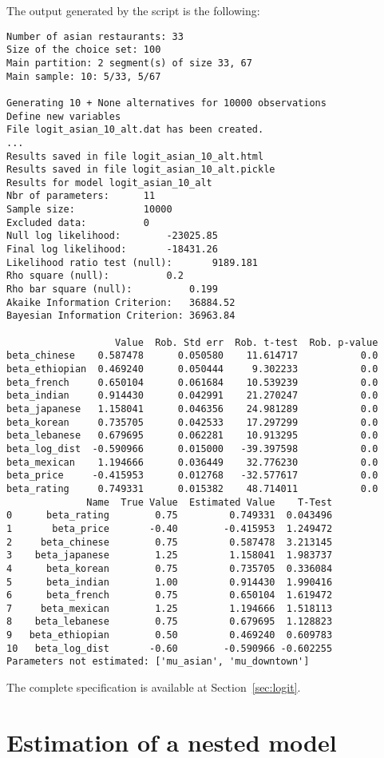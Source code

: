 \documentclass[12pt,a4paper]{article}
\begin{document}
The output generated by the script is the following:
\begin{lstlisting}
Number of asian restaurants: 33
Size of the choice set: 100
Main partition: 2 segment(s) of size 33, 67
Main sample: 10: 5/33, 5/67

Generating 10 + None alternatives for 10000 observations
Define new variables
File logit_asian_10_alt.dat has been created.
...
Results saved in file logit_asian_10_alt.html
Results saved in file logit_asian_10_alt.pickle
Results for model logit_asian_10_alt
Nbr of parameters:		11
Sample size:			10000
Excluded data:			0
Null log likelihood:		-23025.85
Final log likelihood:		-18431.26
Likelihood ratio test (null):		9189.181
Rho square (null):			0.2
Rho bar square (null):			0.199
Akaike Information Criterion:	36884.52
Bayesian Information Criterion:	36963.84

                   Value  Rob. Std err  Rob. t-test  Rob. p-value
beta_chinese    0.587478      0.050580    11.614717           0.0
beta_ethiopian  0.469240      0.050444     9.302233           0.0
beta_french     0.650104      0.061684    10.539239           0.0
beta_indian     0.914430      0.042991    21.270247           0.0
beta_japanese   1.158041      0.046356    24.981289           0.0
beta_korean     0.735705      0.042533    17.297299           0.0
beta_lebanese   0.679695      0.062281    10.913295           0.0
beta_log_dist  -0.590966      0.015000   -39.397598           0.0
beta_mexican    1.194666      0.036449    32.776230           0.0
beta_price     -0.415953      0.012768   -32.577617           0.0
beta_rating     0.749331      0.015382    48.714011           0.0
              Name  True Value  Estimated Value    T-Test
0      beta_rating        0.75         0.749331  0.043496
1       beta_price       -0.40        -0.415953  1.249472
2     beta_chinese        0.75         0.587478  3.213145
3    beta_japanese        1.25         1.158041  1.983737
4      beta_korean        0.75         0.735705  0.336084
5      beta_indian        1.00         0.914430  1.990416
6      beta_french        0.75         0.650104  1.619472
7     beta_mexican        1.25         1.194666  1.518113
8    beta_lebanese        0.75         0.679695  1.128823
9   beta_ethiopian        0.50         0.469240  0.609783
10   beta_log_dist       -0.60        -0.590966 -0.602255
Parameters not estimated: ['mu_asian', 'mu_downtown']
\end{lstlisting}

The complete specification is available at Section~\ref{sec:logit}.
\section{Estimation of a nested model}
\end{document}
